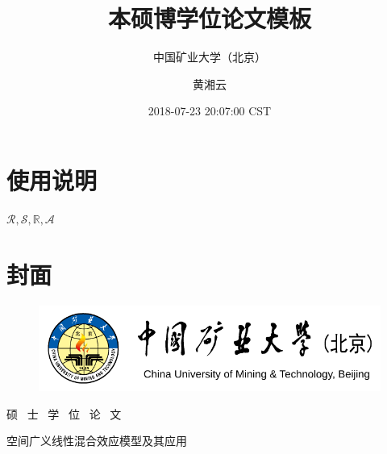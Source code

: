 \documentclass[hyperref, a4paper, UTF8, zihao = -4, linespread = 1.3, table,
notitlepage]{book}
\title{本硕博学位论文模板}
\subtitle{中国矿业大学（北京）}
\author{黄湘云}
\date{2018-07-23 20:07:00 CST}
\begin{document}
\maketitle

\thispagestyle{empty}
\setlength{\abovedisplayskip}{-5pt}
\setlength{\abovedisplayshortskip}{-5pt}
\setcounter{page}{1}


\hypersetup{linkcolor=magenta}
\setcounter{tocdepth}{2}
\tableofcontents

\hypertarget{instructions}{%
\chapter*{使用说明}\label{instructions}}


\(\mathcal{R,S},\mathbb{R},\mathscr{A}\)

\hypertarget{cover}{%
\chapter*{封面}\label{cover}}


\thispagestyle{empty}

\begin{figure}[h]
\vspace{1.9cm}
\centering
\includegraphics[width=5in]{images/cumtb}
\end{figure}

\vspace{1cm}

\begin{center}
{\huge{\heiti{}硕~ 士~ 学~ 位~ 论~ 文}}   \\

\vspace{1.5cm} 

{\heiti{}空间广义线性混合效应模型及其应用} \\ 
\end{center}

\vspace{2.5cm}
\end{document}
